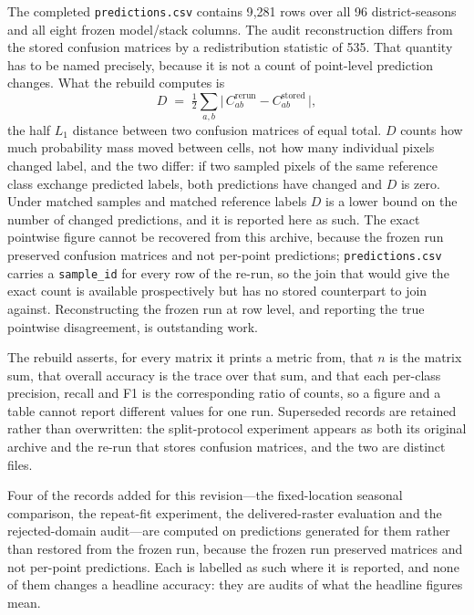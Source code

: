 \documentclass[conference]{IEEEtran}
\begin{document}
The completed \texttt{predictions.csv} contains 9{,}281 rows over all 96 district-seasons and all eight frozen model/stack columns. The audit reconstruction differs from the stored confusion matrices by a redistribution statistic of 535. That quantity has to be named precisely, because it is not a count of point-level prediction changes. What the rebuild computes is
\begin{equation}
D \;=\; \tfrac{1}{2}\sum_{a,b}\bigl|\,C^{\mathrm{rerun}}_{ab}-C^{\mathrm{stored}}_{ab}\,\bigr|,
\label{eq:matrixdist}
\end{equation}
the half $L_1$ distance between two confusion matrices of equal total. $D$ counts how much probability mass moved between cells, not how many individual pixels changed label, and the two differ: if two sampled pixels of the same reference class exchange predicted labels, both predictions have changed and $D$ is zero. Under matched samples and matched reference labels $D$ is a lower bound on the number of changed predictions, and it is reported here as such. The exact pointwise figure cannot be recovered from this archive, because the frozen run preserved confusion matrices and not per-point predictions; \texttt{predictions.csv} carries a \texttt{sample\_id} for every row of the re-run, so the join that would give the exact count is available prospectively but has no stored counterpart to join against. Reconstructing the frozen run at row level, and reporting the true pointwise disagreement, is outstanding work.

The rebuild asserts, for every matrix it prints a metric from, that $n$ is the matrix sum, that overall accuracy is the trace over that sum, and that each per-class precision, recall and F1 is the corresponding ratio of counts, so a figure and a table cannot report different values for one run. Superseded records are retained rather than overwritten: the split-protocol experiment appears as both its original archive and the re-run that stores confusion matrices, and the two are distinct files.

Four of the records added for this revision---the fixed-location seasonal comparison, the repeat-fit experiment, the delivered-raster evaluation and the rejected-domain audit---are computed on predictions generated for them rather than restored from the frozen run, because the frozen run preserved matrices and not per-point predictions. Each is labelled as such where it is reported, and none of them changes a headline accuracy: they are audits of what the headline figures mean.
\end{document}
